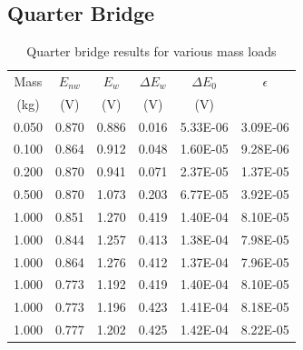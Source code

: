 \section{}

\subsection{Quarter Bridge}

\begin{table}[h]
    \centering
    \caption{Quarter bridge results for various mass loads}
    \label{tab:Q1QuarterBridge}
    \begin{tabular}{cccccc}
        \toprule
        Mass & $E_{nw}$ & $E_w$ & $\Delta E_w$ & $\Delta E_0$ & $\epsilon$ \\
        (kg) & (V) & (V) & (V) & (V) & \\
        \midrule
        0.050 & 0.870 & 0.886 & 0.016 & 5.33E-06 & 3.09E-06 \\
        0.100 & 0.864 & 0.912 & 0.048 & 1.60E-05 & 9.28E-06 \\
        0.200 & 0.870 & 0.941 & 0.071 & 2.37E-05 & 1.37E-05 \\
        0.500 & 0.870 & 1.073 & 0.203 & 6.77E-05 & 3.92E-05 \\
        1.000 & 0.851 & 1.270 & 0.419 & 1.40E-04 & 8.10E-05 \\
        1.000 & 0.844 & 1.257 & 0.413 & 1.38E-04 & 7.98E-05 \\
        1.000 & 0.864 & 1.276 & 0.412 & 1.37E-04 & 7.96E-05 \\
        1.000 & 0.773 & 1.192 & 0.419 & 1.40E-04 & 8.10E-05 \\
        1.000 & 0.773 & 1.196 & 0.423 & 1.41E-04 & 8.18E-05 \\
        1.000 & 0.777 & 1.202 & 0.425 & 1.42E-04 & 8.22E-05 \\
        \bottomrule
    \end{tabular}
\end{table}

